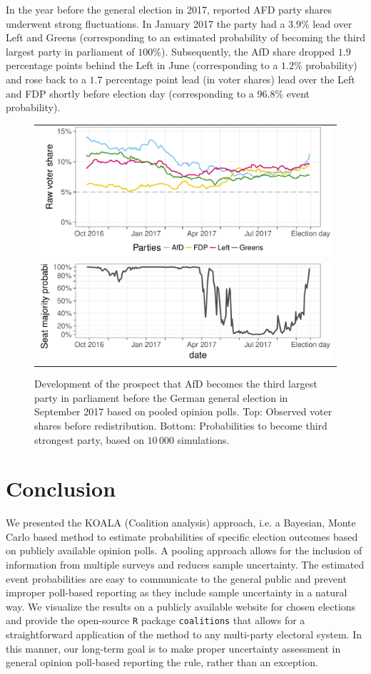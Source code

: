 \documentclass[smallcondensed]{svjour3}     %
\begin{document}
In the year before the general election in 2017, reported AFD party shares
underwent strong fluctuations. In January 2017 the party had a $3.9\%$ lead
over Left and Greens (corresponding to an estimated probability of becoming the
third largest party in parliament of $100\%$). Subsequently, the AfD share
dropped $1.9$ percentage points behind the Left in June
(corresponding to a $1.2\%$ probability)
and rose back to a $1.7$ percentage point lead (in voter shares) lead over the Left
and FDP shortly before election day (corresponding to a $96.8\%$ event probability).

\begin{figure}[H]\centering
\begin{tabular}{l}
\includegraphics[height=.2\textwidth]{figures/2017_pooled_afd_rawShares.pdf}
\\
\includegraphics[height=.15\textwidth]{figures/2017_pooled_afd_thirdPartyProb.pdf}
\end{tabular}
\caption{Development of the prospect that AfD becomes the third largest party
in parliament before the German general election in September 2017 based on pooled
opinion polls.
Top: Observed voter shares before redistribution.
Bottom: Probabilities to become third strongest party, based on $10\,000$ simulations.
\label{fig:2017_afd}
}
\end{figure}


\section{Conclusion} \label{sec:conclusion}
We presented the KOALA (Coalition analysis) approach,
i.e. a Bayesian, Monte Carlo based method to estimate probabilities of specific
election outcomes based on publicly available opinion polls.
A pooling approach allows for the inclusion of information from multiple
surveys and reduces sample uncertainty.
The estimated event probabilities are easy to communicate to the general
public and prevent improper poll-based reporting as they include
sample uncertainty in a natural way.
We visualize the results on a publicly available website for chosen elections and
provide the open-source \texttt{R} package \texttt{coalitions} that allows for a
straightforward application of the method to any multi-party electoral system.
In this manner, our long-term goal is to make proper uncertainty assessment
in general opinion poll-based reporting the rule, rather than an exception.
\end{document}

